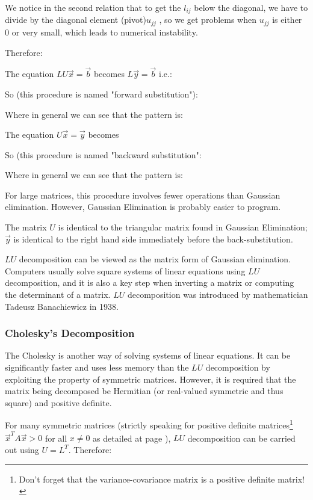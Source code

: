 	\begin{tcolorbox}[title=Remark,colframe=black,arc=10pt]
	We notice in the second relation that to get the $l_{ij}$ below the diagonal, we have to divide by the diagonal element (pivot)$u_{jj}$ , so we get problems when $u_{jj}$ is either $0$ or very small, which leads to numerical instability.
	\end{tcolorbox}
	
	Therefore:
	
	The equation $LU\vec{x} = \vec{b}$ becomes $L\vec{y} =
	\vec{b}$ i.e.:
	
	So (this procedure is named "forward substitution"):
	
	Where in general we can see that the pattern is:
	
	The equation $U\vec{x} = \vec{y}$ becomes 
	
	So (this procedure is named "backward substitution":
	
	Where in general we can see that the pattern is:
	
	For large matrices, this procedure involves fewer operations than Gaussian elimination. However, Gaussian Elimination is probably easier to program.
	
	The matrix $U$ is identical to the triangular matrix found in Gaussian Elimination;	$\vec{y}$ is identical to the right hand side immediately before the back-substitution.
	
	$LU$ decomposition can be viewed as the matrix form of Gaussian elimination. Computers usually solve square systems of linear equations using $LU$ decomposition, and it is also a key step when inverting a matrix or computing the determinant of a matrix. $LU$ decomposition was introduced by mathematician Tadeusz Banachiewicz in 1938.
	

	\subsubsection{Cholesky's Decomposition}\label{Cholesky decomposition}
	The Cholesky is another way of solving systems of linear equations. It can be significantly faster and uses less memory than the $LU$ decomposition by exploiting the property of symmetric matrices. However, it is required that the matrix being decomposed be Hermitian (or real-valued symmetric and thus square) and positive definite.
	
	For many symmetric matrices (strictly speaking for positive definite matrices\footnote{Don't forget that the variance-covariance matrix is a positive definite matrix!} $\vec{x}^{T} A \vec{x} > 0$ for all $x \ne 0$ as detailed at page \pageref{positive definite matrix}), $LU$ decomposition can be carried out using $U = L^{T}$. Therefore:
		
